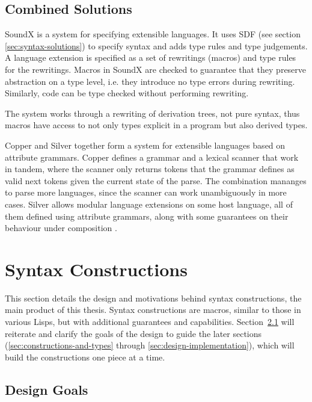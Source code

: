 \documentclass{kththesis}
\begin{document}
\section{Combined Solutions} \label{sec:full-solutions}

SoundX \cite{Lorenzen2016Sound-type-depe} is a system for specifying extensible languages. It uses SDF (see section \ref{sec:syntax-solutions}) to specify syntax and adds type rules and type judgements. A language extension is specified as a set of rewritings (macros) and type rules for the rewritings. Macros in SoundX are checked to guarantee that they preserve abstraction on a type level, i.e. they introduce no type errors during rewriting. Similarly, code can be type checked without performing rewriting.

The system works through a rewriting of derivation trees, not pure syntax, thus macros have access to not only types explicit in a program but also derived types.

Copper \cite{Van-Wyk2007Context-aware-s} and Silver \cite{Van-Wyk2010Silver:-An-exte} together form a system for extensible languages based on attribute grammars. Copper defines a grammar and a lexical scanner that work in tandem, where the scanner only returns tokens that the grammar defines as valid next tokens given the current state of the parse. The combination mananges to parse more languages, since the scanner can work unambiguously in more cases. Silver allows modular language extensions on some host language, all of them defined using attribute grammars, along with some guarantees on their behaviour under composition \cite{Kaminski2017Reliably-compos}.

\chapter{Syntax Constructions} \label{sec:syntax-constructions}

This section details the design and motivations behind syntax constructions, the main product of this thesis. Syntax constructions are macros, similar to those in various Lisps, but with additional guarantees and capabilities. Section~\ref{sec:design-goals} will reiterate and clarify the goals of the design to guide the later sections (\ref{sec:constructions-and-types} through \ref{sec:design-implementation}), which will build the constructions one piece at a time.

\section{Design Goals} \label{sec:design-goals}
\end{document}
